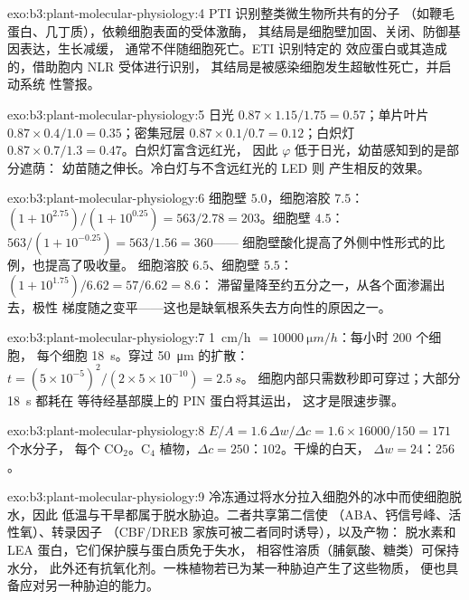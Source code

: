 \begin{solution}{exo:b3:plant-molecular-physiology:4}
PTI 识别整类微生物所共有的分子
（如鞭毛蛋白、几丁质），依赖细胞表面的受体激酶，
其结局是细胞壁加固、关闭、防御基因表达，生长减缓，
通常不伴随细胞死亡。ETI 识别特定的
效应蛋白或其造成的，借助胞内 NLR 受体进行识别，
其结局是被感染细胞发生超敏性死亡，并启动系统
性警报。
\end{solution}

\begin{solution}{exo:b3:plant-molecular-physiology:5}
日光 $0.87\times 1.15/1.75 = 0.57$；单片叶片 $0.87\times 0.4/1.0 =
0.35$；密集冠层 $0.87\times 0.1/0.7 = 0.12$；白炽灯
$0.87\times 0.7/1.3 = 0.47$。白炽灯富含远红光，
因此 $\varphi$ 低于日光，幼苗感知到的是部分遮荫：
幼苗随之伸长。冷白灯与不含远红光的 LED 则
产生相反的效果。
\end{solution}

\begin{solution}{exo:b3:plant-molecular-physiology:6}
细胞壁 $5.0$，细胞溶胶 $7.5$：$(1 + 10^{2.75})/(1 + 10^{0.25}) = 563/2.78
= 203$。细胞壁 $4.5$：$563/(1 + 10^{-0.25}) = 563/1.56 = 360$——
细胞壁酸化提高了外侧中性形式的比例，也提高了吸收量。
细胞溶胶 $6.5$、细胞壁 $5.5$：$(1 + 10^{1.75})/6.62 = 57/6.62 = 8.6$：
滞留量降至约五分之一，从各个面渗漏出去，极性
梯度随之变平——这也是缺氧根系失去方向性的原因之一。
\end{solution}

\begin{solution}{exo:b3:plant-molecular-physiology:7}
\qty{1}{cm/h} $= \qty{10000}{\micro m/h}$：每小时 $200$ 个细胞，
每个细胞 \qty{18}{s}。穿过 \qty{50}{\micro m} 的扩散：$t =
(5\times 10^{-5})^{2}/(2\times 5\times 10^{-10}) = \qty{2.5}{s}$。
细胞内部只需数秒即可穿过；大部分 \qty{18}{s} 都耗在
等待经基部膜上的 PIN 蛋白将其运出，
这才是限速步骤。
\end{solution}

\begin{solution}{exo:b3:plant-molecular-physiology:8}
$E/A = 1.6\,\Delta w/\Delta c = 1.6\times\num{16000}/150 = 171$ 个水分子，
每个 CO$_{2}$。C$_{4}$ 植物，$\Delta c = 250$：$102$。干燥的白天，
$\Delta w = 24$：$256$。
\end{solution}

\begin{solution}{exo:b3:plant-molecular-physiology:9}
冷冻通过将水分拉入细胞外的冰中而使细胞脱水，因此
低温与干旱都属于脱水胁迫。二者共享第二信使
（ABA、钙信号峰、活性氧）、转录因子
（CBF/DREB 家族可被二者同时诱导），以及产物：
脱水素和 LEA 蛋白，它们保护膜与蛋白质免于失水，
相容性溶质（脯氨酸、糖类）可保持水分，
此外还有抗氧化剂。一株植物若已为某一种胁迫产生了这些物质，
便也具备应对另一种胁迫的能力。
\end{solution}

